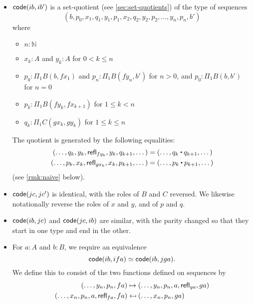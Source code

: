 \begin{itemize}
\item $\mathsf{code}(ib,ib')$ is a set-quotient (see \autoref{sec:set-quotients}) of the type of sequences %
  \[ (b, p_0, x_1, q_1, y_1, p_1, x_2, q_2, y_2, p_2, \dots, y_n, p_n, b') \]
  where
  \begin{itemize}
  \item $n:\mathbb{N}$
  \item $x_k:A$ and $y_k:A$ for $0<k \le n$
  \item $p_0:\Pi_1B(b,f x_1)$ and $p_n:\Pi_1B(f y_n, b')$ for $n>0$, and $p_0:\Pi_1B(b,b')$ for $n=0$
  \item $p_k:\Pi_1B(f y_k, fx_{k+1})$ for $1\le k < n$
  \item $q_k:\Pi_1C(gx_k, gy_k)$ for $1\le k\le n$
  \end{itemize}
  The quotient is generated by the following equalities:
  \begin{alignat*}{2}
    (\dots, q_k, y_k, \refl{fy_k}, y_k, q_{k+1},\dots)
    &= (\dots, q_k\ct q_{k+1},\dots)\\
    (\dots, p_k, x_k, \refl{gx_k}, x_k, p_{k+1},\dots)
    &= (\dots, p_k\ct p_{k+1},\dots)
  \end{alignat*}
  (see \autoref{rmk:naive} below).
\item $\mathsf{code}(jc,jc')$ is identical, with the roles of $B$ and $C$ reversed.
  We likewise notationally reverse the roles of $x$ and $y$, and of $p$ and $q$.
\item $\mathsf{code}(ib,jc)$ and $\mathsf{code}(jc,ib)$ are similar, with the parity changed so that they start in one type and end in the other.
\item For $a:A$ and $b:B$, we require an equivalence
  \begin{equation}
    \code(ib, ifa) \simeq \code(ib,jga).\label{eq:bfa-bga}
  \end{equation}
  We define this to consist of the two functions defined on sequences by
  \begin{align*}
    (\dots, y_n, p_n,fa) &\mapsto (\dots,y_n,p_n,a,\refl{ga},ga)\\
    (\dots, x_n, p_n, a, \refl{fa}, fa) &\mapsfrom (\dots, x_n, p_n, ga)

\end{align*}
\end{itemize}
